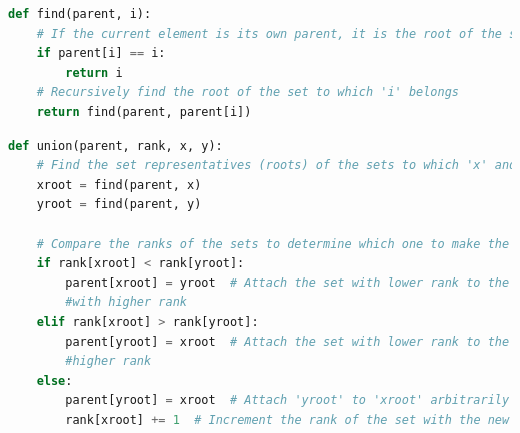 \documentclass[a4paper, 10pt, twocolumn]{article}
\begin{document}
\begin{lstlisting}[language=Python, caption={Python code to find parent}]
def find(parent, i):
    # If the current element is its own parent, it is the root of the set
    if parent[i] == i:
        return i
    # Recursively find the root of the set to which 'i' belongs
    return find(parent, parent[i])
\end{lstlisting}
\begin{lstlisting}[language=Python, caption={Python code to perform the union of two sets represented by their set representatives}]
def union(parent, rank, x, y):
    # Find the set representatives (roots) of the sets to which 'x' and 'y' belong
    xroot = find(parent, x)
    yroot = find(parent, y)

    # Compare the ranks of the sets to determine which one to make the parent
    if rank[xroot] < rank[yroot]:
        parent[xroot] = yroot  # Attach the set with lower rank to the one 
        #with higher rank
    elif rank[xroot] > rank[yroot]:
        parent[yroot] = xroot  # Attach the set with lower rank to the one with 
        #higher rank
    else:
        parent[yroot] = xroot  # Attach 'yroot' to 'xroot' arbitrarily
        rank[xroot] += 1  # Increment the rank of the set with the new parent
\end{lstlisting}
\newpage
\end{document}
